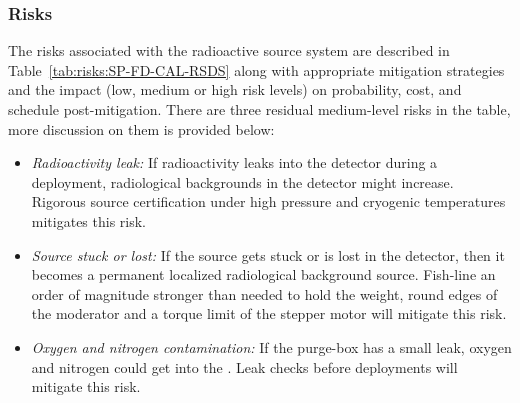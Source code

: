 \subsubsection{Risks}
The risks associated with the radioactive source system are described in Table~\ref{tab:risks:SP-FD-CAL-RSDS} along with appropriate mitigation strategies and the impact (low, medium or high risk levels) on probability, cost, and schedule post-mitigation. There are three residual medium-level risks in the table, more discussion on them is provided below:
\begin{itemize}
    \item {\it Radioactivity leak:} If radioactivity leaks into the detector during a deployment, radiological backgrounds in the detector might increase. Rigorous source certification under high pressure and cryogenic temperatures mitigates this risk.
    \item {\it Source stuck or lost:} If the source gets stuck or is lost in the detector, then it becomes a permanent localized radiological background source. Fish-line an order of magnitude stronger than needed to hold the weight, round edges of the moderator and a torque limit of the stepper motor will mitigate this risk.
    \item {\it Oxygen and nitrogen contamination:} If the purge-box has a small leak, oxygen and nitrogen could get into the . Leak checks before deployments will mitigate this risk.
\end{itemize}



